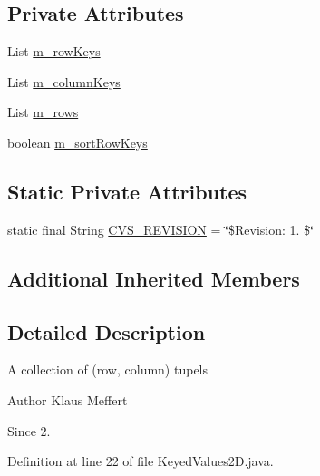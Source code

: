 \subsection*{Private Attributes}
\begin{DoxyCompactItemize}
\item 
List \hyperlink{classorg_1_1jgap_1_1audit_1_1_keyed_values2_d_ad145c9abe9f3decc0c45ce8535ab108d}{m\-\_\-row\-Keys}
\item 
List \hyperlink{classorg_1_1jgap_1_1audit_1_1_keyed_values2_d_a5be5d5ef6399fad7b5d6d3962d8b4e64}{m\-\_\-column\-Keys}
\item 
List \hyperlink{classorg_1_1jgap_1_1audit_1_1_keyed_values2_d_a71728c8c375dd98c99ac17a434dd2a8e}{m\-\_\-rows}
\item 
boolean \hyperlink{classorg_1_1jgap_1_1audit_1_1_keyed_values2_d_a757976950b14fb997db021c7efdc083d}{m\-\_\-sort\-Row\-Keys}
\end{DoxyCompactItemize}
\subsection*{Static Private Attributes}
\begin{DoxyCompactItemize}
\item 
static final String \hyperlink{classorg_1_1jgap_1_1audit_1_1_keyed_values2_d_ad086a0c622fe90f593c56161f3c2f53a}{C\-V\-S\-\_\-\-R\-E\-V\-I\-S\-I\-O\-N} = \char`\"{}\$Revision\-: 1. \$\char`\"{}
\end{DoxyCompactItemize}
\subsection*{Additional Inherited Members}


\subsection{Detailed Description}
A collection of (row, column) tupels

\begin{DoxyAuthor}{Author}
Klaus Meffert 
\end{DoxyAuthor}
\begin{DoxySince}{Since}
2. 
\end{DoxySince}


Definition at line 22 of file Keyed\-Values2\-D.\-java.



